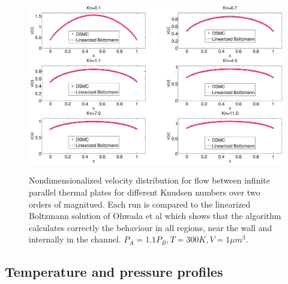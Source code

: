 \begin{figure}[h]
\includegraphics[width=\textwidth, trim=6cm 0cm 5cm 0cm, clip]{DSMC/figures/validation_poiseuille.eps}
\label{fig:dsmc_validation_poiseuille}
\centering
\caption{Nondimensionalized velocity distribution for flow between infinite parallel thermal plates for different Knudsen numbers over two orders of magnitued. Each run is compared to the linearized Boltzmann solution of Ohwada et al\cite{ohwada1989numerical} which shows that the algorithm calculates correctly the behaviour in all regions, near the wall and internally in the channel. $P_A = 1.1P_B, T=300K, V=1\mu m^3$.}
\end{figure}

\subsection{Temperature and pressure profiles}